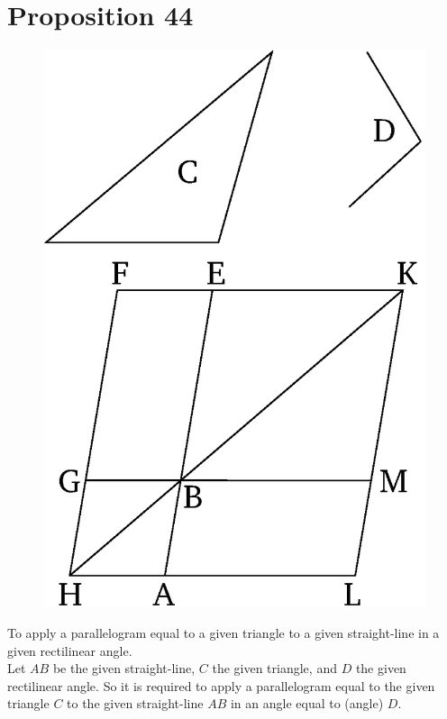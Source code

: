 \chapter*{Proposition 44}



\begin{figure}[ht]
    \begin{center}
    \includegraphics[width=0.5\linewidth]{figures/fig44e.eps}
    \label{fig:prop_44}
    \end{center}
\end{figure}

To apply a parallelogram equal to a given triangle to a given straight-line
in a given rectilinear angle.\\

Let $AB$ be the given straight-line,  $C$ the given triangle, and $D$ the
given rectilinear angle. So it is required to apply a parallelogram
equal to the given triangle $C$ to the given straight-line $AB$ in an angle equal to (angle) $D$.

